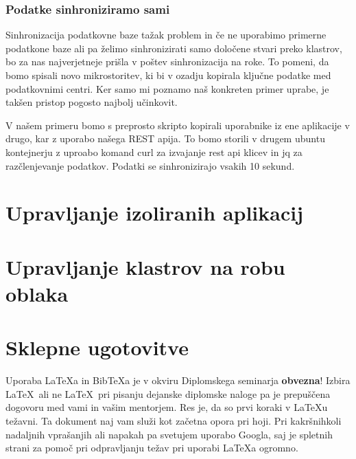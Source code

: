 \documentclass[a4paper, 12pt]{book}
\newcommand{\BibTeX}{{\sc Bib}\TeX}
\begin{document}
\subsection{Podatke sinhroniziramo sami}
Sinhronizacija podatkovne baze tažak problem in če ne uporabimo primerne podatkone baze ali pa želimo sinhronizirati samo določene stvari preko klastrov, bo za nas najverjetneje prišla v poštev sinhronizacija na roke. To pomeni, da bomo spisali novo mikrostoritev, ki bi v ozadju kopirala ključne podatke med podatkovnimi centri.
Ker samo mi poznamo naš konkreten primer uprabe, je takšen pristop pogosto najbolj učinkovit.

V našem primeru bomo s preprosto skripto kopirali uporabnike iz ene aplikacije v drugo, kar z uporabo našega REST apija.
To bomo storili v drugem ubuntu kontejnerju z uproabo komand curl za izvajanje rest api klicev in jq za razčlenjevanje podatkov.
Podatki se sinhronizirajo vsakih 10 sekund.



\chapter{Upravljanje izoliranih aplikacij}
\chapter{Upravljanje klastrov na robu oblaka}

\chapter{Sklepne ugotovitve}
Uporaba \LaTeX{a} in \BibTeX{a} je v okviru Diplomskega seminarja \textbf{obvezna}!
Izbira \LaTeX\ ali ne \LaTeX\ pri pisanju dejanske diplomske naloge pa je pre\-pu\-šče\-na dogovoru med vami in vašim mentorjem.
Res je, da so prvi koraki v \LaTeX{}u težavni. 
Ta dokument naj vam služi kot začetna opora pri hoji.
Pri kakršnihkoli nadaljnih vprašanjih ali napakah pa svetujem uporabo Googla, saj je spletnih strani za pomoč pri odpravljanju težav pri uporabi \LaTeX{}a ogromno.
\newpage %
\ \\
\clearpage
{}


\end{document}
